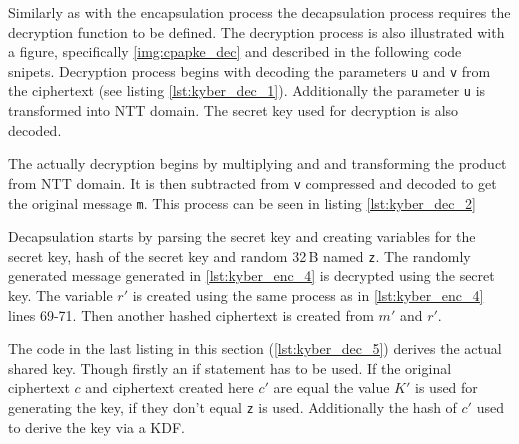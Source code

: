 Similarly as with the encapsulation process the decapsulation process requires the decryption function to be defined. The decryption process is also illustrated with a figure, specifically \ref{img:cpapke_dec} and described in the following code snipets. Decryption process begins with decoding the parameters \texttt{u} and \texttt{v} from the ciphertext (see listing \ref{lst:kyber_dec_1}). Additionally the parameter \texttt{u} is transformed into NTT domain. The secret key used for decryption is also decoded.

The actually decryption begins by multiplying  and  and transforming the product from NTT domain. It is then subtracted from \texttt{v} compressed and decoded to get the original message \texttt{m}. This process can be seen in listing \ref{lst:kyber_dec_2}


Decapsulation starts by parsing the secret key and creating variables for the secret key, hash of the secret key and random 32\,B named \texttt{z}. The randomly generated message generated in \ref{lst:kyber_enc_4} is decrypted using the secret key. The variable $r'$ is created using the same process as in \ref{lst:kyber_enc_4} lines 69-71. Then another hashed ciphertext is created from $m'$ and $r'$.

The code in the last listing in this section (\ref{lst:kyber_dec_5}) derives the actual shared key. Though firstly an if statement has to be used. If the original ciphertext $c$ and ciphertext created here $c'$ are equal the value $K'$ is used for generating the key, if they don't equal \texttt{z} is used. Additionally the hash of $c'$ used to derive the key via a KDF.
